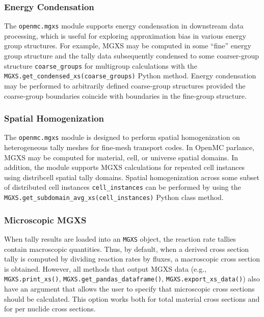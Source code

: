 \subsubsection{Energy Condensation}
\label{subsec:energy-condense}

The \texttt{openmc.mgxs} module supports energy condensation in downstream data processing, which is useful for exploring approximation bias in various energy group structures. For example, MGXS may be computed in some ``fine'' energy group structure and the tally data subsequently condensed to some coarser-group structure \texttt{coarse_groups} for multigroup calculations with the \texttt{MGXS.get_condensed_xs(coarse_groups)} Python method. Energy condensation may be performed to arbitrarily defined coarse-group structures provided the coarse-group boundaries coincide with boundaries in the fine-group structure.


\subsubsection{Spatial Homogenization}
\label{subsec:pinwise-homogenize}

The \texttt{openmc.mgxs} module is designed to perform spatial homogenization on heterogeneous tally meshes for fine-mesh transport codes. In OpenMC parlance, MGXS may be computed for material, cell, or universe spatial domains. In addition, the module supports MGXS calculations for repeated cell instances using distribcell spatial tally domains\cite{lax2014distribcell}. Spatial homogenization across some subset of distributed cell instances \texttt{cell_instances} can be performed by using the \texttt{MGXS.get_subdomain_avg_xs(cell_instances)} Python class method.



\subsubsection{Microscopic MGXS}
\label{subsec:micro-macro}

When tally results are loaded into an \texttt{MGXS} object, the reaction rate tallies contain macroscopic quantities. Thus, by default, when a derived cross section tally is computed by dividing reaction rates by fluxes, a macroscopic cross section is obtained. However, all methods that output MGXS data (\textrm{e.g.}, \texttt{MGXS.print_xs()}, \texttt{MGXS.get_pandas_dataframe()}, \texttt{MGXS.export_xs_data()}) also have an argument that allows the user to specify that microscopic cross sections should be calculated. This option works both for total material cross sections and for per nuclide cross sections.

